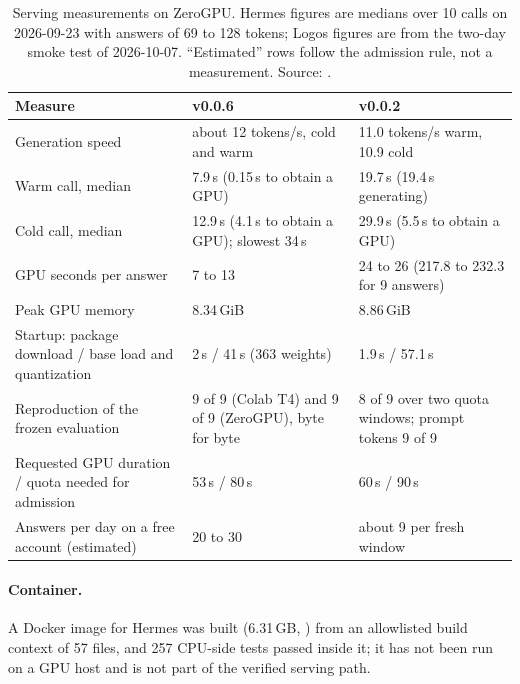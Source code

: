 \begin{table}[t]
\centering\small
\caption{Serving measurements on ZeroGPU. Hermes figures are medians over 10 calls on 2026-09-23 with answers of 69 to 128 tokens; Logos figures are from the two-day smoke test of 2026-10-07. ``Estimated'' rows follow the admission rule, not a measurement. Source: .}
\label{tab:serving}
\begin{tabular}{L{56mm}L{44mm}L{52mm}}
\toprule
Measure & \hermes{} v0.0.6 & \logos{} v0.0.2 \\
\midrule
Generation speed & about 12 tokens/s, cold and warm & 11.0 tokens/s warm, 10.9 cold \\
Warm call, median & 7.9\,s (0.15\,s to obtain a GPU) & 19.7\,s (19.4\,s generating) \\
Cold call, median & 12.9\,s (4.1\,s to obtain a GPU); slowest 34\,s & 29.9\,s (5.5\,s to obtain a GPU) \\
GPU seconds per answer & 7 to 13 & 24 to 26 (217.8 to 232.3 for 9 answers) \\
Peak GPU memory & 8.34\,GiB & 8.86\,GiB \\
Startup: package download / base load and quantization & 2\,s / 41\,s (363 weights) & 1.9\,s / 57.1\,s \\
Reproduction of the frozen evaluation & 9 of 9 (Colab T4) and 9 of 9 (ZeroGPU), byte for byte & 8 of 9 over two quota windows; prompt tokens 9 of 9 \\
Requested GPU duration / quota needed for admission & 53\,s / 80\,s & 60\,s / 90\,s \\
Answers per day on a free account (estimated) & 20 to 30 & about 9 per fresh window \\
\bottomrule
\end{tabular}
\end{table}

\paragraph{Container.}
A Docker image for Hermes was built (6.31\,GB, ) from an allowlisted build context of 57 files, and 257 CPU-side tests passed inside it; it has not been run on a GPU host and is not part of the verified serving path.
